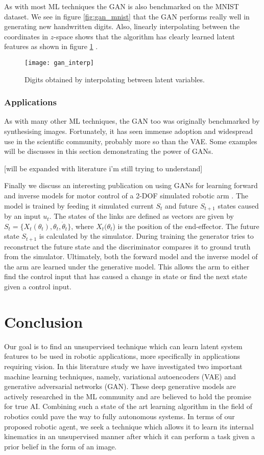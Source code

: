\documentclass[main.tex]{subfiles}
\begin{document}
As with most ML techniques the GAN is also benchmarked on the MNIST dataset. We see in figure \ref{fig:gan_mnist} that the GAN performs really well in generating new handwritten digits. Also, linearly interpolating between the coordinates in $z$-space shows that the algorithm has clearly learned latent features as shown in figure \ref{fig:gan_mnist_interp} .

\begin{figure}[htb]
    \centering
    \texttt{[image: gan\_interp]}
    \caption{Digits obtained by interpolating between latent variables.}
    \label{fig:gan_mnist_interp}
\end{figure}


\subsection{Applications}
As with many other ML techniques, the GAN too was originally benchmarked by synthesising images. Fortunately, it has seen immense adoption and widespread use in the scientific community, probably more so than the VAE. Some examples will be discusses in this section demonstrating the power of GANs.

[will be expanded with literature i'm still trying to understand]

Finally we discuss an interesting publication on using GANs for learning forward and inverse models for motor control of a 2-DOF simulated robotic arm \cite{lenninger2017generative}. The model is trained by feeding it simulated current $S_t$ and future $S_{t+1}$ states caused by an input $u_t$. The states of the links are defined as vectors are given by $S_{t} = \{X_t(\theta_t),\theta_t, \dot{\theta}_t\}$, where $X_t(\theta_t$) is the position of the end-effector. The future state $S_{t+1}$ is calculated by the simulator. During training the generator tries to reconstruct the future state and the discriminator compares it to ground truth from the simulator. Ultimately, both the forward model and the inverse model of the arm are learned under the generative model. This allows the arm to either find the control input that has caused a change in state or find the next state given a control input.

\chapter{Conclusion}
Our goal is to find an unsupervised technique which can learn latent system features to be used in robotic applications, more specifically in applications requiring vision. In this literature study we have investigated  two important machine learning techniques, namely, variational autoencoders (VAE) and generative adversarial networks (GAN). These deep generative models are actively researched in the ML community and are believed to hold the promise for true AI. Combining such a state of the art learning algorithm in the field of robotics could pave the way to fully autonomous systems. In terms of our proposed robotic agent, we seek a technique which allows it to learn its internal kinematics in an unsupervised manner after which it can perform a task given a prior belief in the form of an image.
\end{document}
